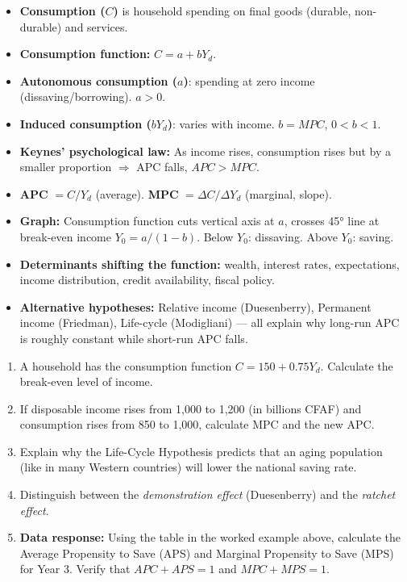 \documentclass[11pt]{article}
\begin{document}
\begin{aretenir}
\begin{itemize}
    \item \textbf{Consumption ($C$)} is household spending on final goods (durable, non-durable) and services.
    \item \textbf{Consumption function:} $C = a + bY_d$.
    \item \textbf{Autonomous consumption ($a$)}: spending at zero income (dissaving/borrowing). $a > 0$.
    \item \textbf{Induced consumption ($bY_d$)}: varies with income. $b = MPC$, $0 < b < 1$.
    \item \textbf{Keynes' psychological law:} As income rises, consumption rises but by a smaller proportion $\Rightarrow$ APC falls, $APC > MPC$.
    \item \textbf{APC} $= C/Y_d$ (average). \textbf{MPC} $= \Delta C/\Delta Y_d$ (marginal, slope).
    \item \textbf{Graph:} Consumption function cuts vertical axis at $a$, crosses 45° line at break-even income $Y_0 = a/(1-b)$. Below $Y_0$: dissaving. Above $Y_0$: saving.
    \item \textbf{Determinants shifting the function:} wealth, interest rates, expectations, income distribution, credit availability, fiscal policy.
    \item \textbf{Alternative hypotheses:} Relative income (Duesenberry), Permanent income (Friedman), Life-cycle (Modigliani) — all explain why long-run APC is roughly constant while short-run APC falls.
\end{itemize}
\end{aretenir}

\begin{exercice}
\begin{enumerate}
    \item A household has the consumption function $C = 150 + 0.75Y_d$. Calculate the break-even level of income.
    \item If disposable income rises from 1,000 to 1,200 (in billions CFAF) and consumption rises from 850 to 1,000, calculate MPC and the new APC.
    \item Explain why the Life-Cycle Hypothesis predicts that an aging population (like in many Western countries) will lower the national saving rate.
    \item Distinguish between the \emph{demonstration effect} (Duesenberry) and the \emph{ratchet effect}.
    \item \textbf{Data response:} Using the table in the worked example above, calculate the Average Propensity to Save (APS) and Marginal Propensity to Save (MPS) for Year 3. Verify that $APC + APS = 1$ and $MPC + MPS = 1$.
\end{enumerate}
\end{exercice}
\end{document}
